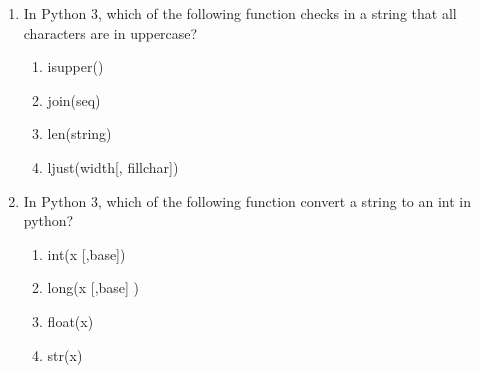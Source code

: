 \documentclass[12pt]{article}
\begin{document}
\begin{enumerate}[label=\arabic*.]
\item In Python 3, which of the following function checks in a string that all characters are in uppercase?
\begin{enumerate}[label=(\alph*)]
    \item isupper()
    \item join(seq)
    \item len(string)
    \item ljust(width[, fillchar])
\end{enumerate}
\item In Python 3, which of the following function convert a string to an int in python?
\begin{enumerate}[label=(\alph*)]
    \item int(x [,base])
    \item long(x [,base] )
    \item float(x)
    \item str(x)
\end{enumerate}
\end{enumerate}
\end{document}
